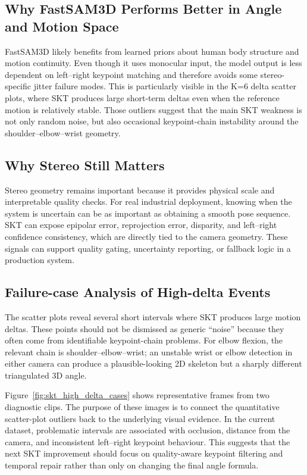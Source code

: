 \documentclass[12pt,a4paper]{article}
\begin{document}
\subsection{Why FastSAM3D Performs Better in Angle and Motion Space}

FastSAM3D likely benefits from learned priors about human body structure and
motion continuity.
Even though it uses monocular input, the model output is less dependent on
left--right keypoint matching and therefore avoids some stereo-specific jitter
failure modes.
This is particularly visible in the K=6 delta scatter plots, where SKT produces
large short-term deltas even when the reference motion is relatively stable.
Those outliers suggest that the main SKT weakness is not only random noise, but
also occasional keypoint-chain instability around the shoulder--elbow--wrist
geometry.

\subsection{Why Stereo Still Matters}

Stereo geometry remains important because it provides physical scale and
interpretable quality checks.
For real industrial deployment, knowing when the system is uncertain can be as
important as obtaining a smooth pose sequence.
SKT can expose epipolar error, reprojection error, disparity, and left--right
confidence consistency, which are directly tied to the camera geometry.
These signals can support quality gating, uncertainty reporting, or fallback
logic in a production system.

\subsection{Failure-case Analysis of High-delta Events}

The scatter plots reveal several short intervals where SKT produces large
motion deltas.
These points should not be dismissed as generic ``noise'' because they often
come from identifiable keypoint-chain problems.
For elbow flexion, the relevant chain is shoulder--elbow--wrist; an unstable
wrist or elbow detection in either camera can produce a plausible-looking 2D
skeleton but a sharply different triangulated 3D angle.

Figure~\ref{fig:skt_high_delta_cases} shows representative frames from two
diagnostic clips.
The purpose of these images is to connect the quantitative scatter-plot
outliers back to the underlying visual evidence.
In the current dataset, problematic intervals are associated with occlusion,
distance from the camera, and inconsistent left--right keypoint behaviour.
This suggests that the next SKT improvement should focus on quality-aware
keypoint filtering and temporal repair rather than only on changing the final
angle formula.
\end{document}

